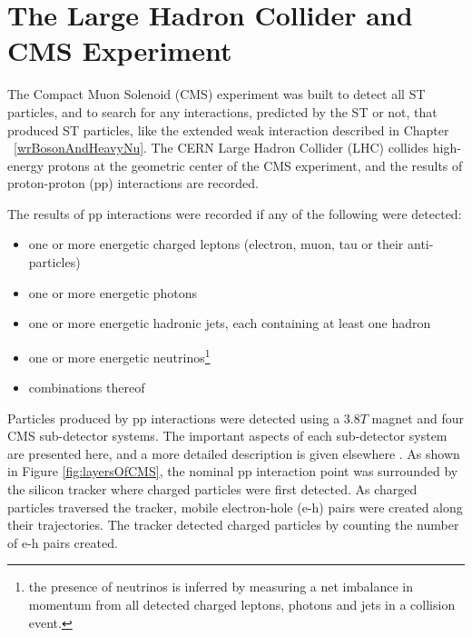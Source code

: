 \chapter{The Large Hadron Collider and CMS Experiment}
\label{sec:experiment_chapter}
The Compact Muon Solenoid (CMS) experiment was built to detect all ST particles, and to
search for any interactions, predicted by the ST or not, that produced ST particles, like the extended 
weak interaction described in Chapter ~\ref{wrBosonAndHeavyNu}.  The CERN Large Hadron Collider (LHC) 
collides high-energy protons at the geometric center of the CMS experiment, and the results of proton-proton (pp) 
interactions are recorded.

The results of pp interactions were recorded if any of the following were detected:
\begin{itemize}
	\item one or more energetic charged leptons (electron, muon, tau or their anti-particles)
	\item one or more energetic photons
	\item one or more energetic hadronic jets, each containing at least one hadron
	\item one or more energetic neutrinos\footnote{the presence of neutrinos is inferred by measuring a net imbalance in 
		momentum from all detected charged leptons, photons and jets in a collision event.}
	\item combinations thereof
\end{itemize}
Particles produced by pp interactions were detected using a 3.8$\unit{T}$ magnet and four CMS 
sub-detector systems.  The important aspects of each sub-detector system are presented here, and a more detailed 
description is given elsewhere \cite{cmsDetectorPaper}.  As shown in Figure \ref{fig:layersOfCMS}, the nominal pp interaction point 
was surrounded by the silicon tracker where charged particles were first detected.  As charged particles traversed
the tracker, mobile electron-hole (e-h) pairs were created along their trajectories.  The tracker detected 
charged particles by counting the number of e-h pairs created.

